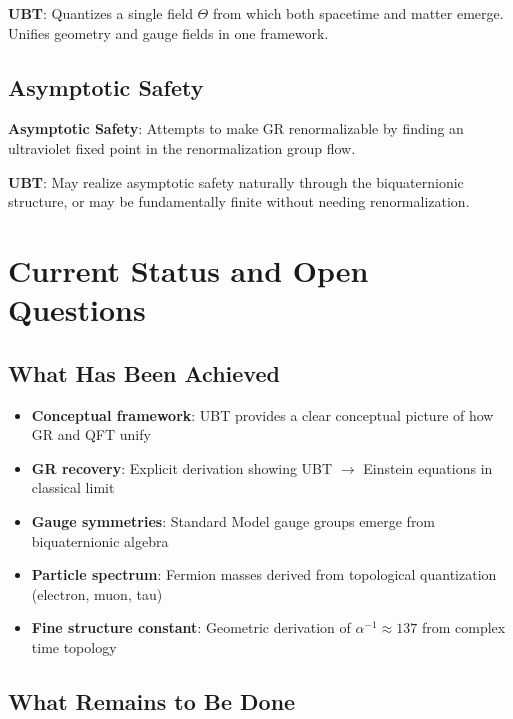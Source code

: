 \documentclass[12pt]{article}
\begin{document}
\textbf{UBT}: Quantizes a single field $\Theta$ from which both spacetime and matter emerge. Unifies geometry and gauge fields in one framework.

\subsection{Asymptotic Safety}

\textbf{Asymptotic Safety}: Attempts to make GR renormalizable by finding an ultraviolet fixed point in the renormalization group flow.

\textbf{UBT}: May realize asymptotic safety naturally through the biquaternionic structure, or may be fundamentally finite without needing renormalization.

\section{Current Status and Open Questions}

\subsection{What Has Been Achieved}

\begin{itemize}
    \item[$\checkmark$] \textbf{Conceptual framework}: UBT provides a clear conceptual picture of how GR and QFT unify
    \item[$\checkmark$] \textbf{GR recovery}: Explicit derivation showing UBT $\to$ Einstein equations in classical limit
    \item[$\checkmark$] \textbf{Gauge symmetries}: Standard Model gauge groups emerge from biquaternionic algebra
    \item[$\checkmark$] \textbf{Particle spectrum}: Fermion masses derived from topological quantization (electron, muon, tau)
    \item[$\checkmark$] \textbf{Fine structure constant}: Geometric derivation of $\alpha^{-1} \approx 137$ from complex time topology
\end{itemize}

\subsection{What Remains to Be Done}
\end{document}
